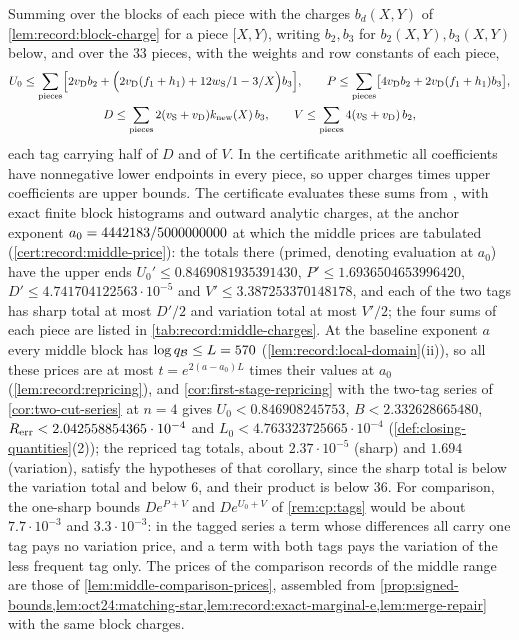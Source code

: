 Summing over the blocks of each piece with the charges $b_d(X,Y)$ of
\cref{lem:record:block-charge} for a piece $[X,Y)$, writing $b_2,b_3$ for $b_2(X,Y),b_3(X,Y)$ below, and over the $33$ pieces, with the weights and
row constants of each piece,
\begin{gather*}
 U_0\le\sum_{\rm pieces}\Bigl[2v_{\rm D}b_2+\Bigl(2v_{\rm D}(f_1+h_1)
  +\frac{12w_{\rm S}}{1-3/X}\Bigr)b_3\Bigr],\qquad
 P\le\sum_{\rm pieces}\bigl[4v_{\rm D}b_2+2v_{\rm D}(f_1+h_1)b_3\bigr],\\
 D\le\sum_{\rm pieces}2(v_{\rm S}+v_{\rm D})k_{\rm new}(X)\,b_3,\qquad
 V\le\sum_{\rm pieces}4(v_{\rm S}+v_{\rm D})\,b_2 ,
\end{gather*}
each tag carrying half of $D$ and of $V$. In the certificate arithmetic all coefficients have nonnegative
lower endpoints in every piece, so upper charges times upper coefficients are
upper bounds. The certificate evaluates these sums from
,
with exact finite block histograms and outward analytic charges, at the anchor exponent
$a_0=\PushAnchor$ at which the middle prices are tabulated
(\cref{cert:record:middle-price}): the totals there (primed, denoting evaluation at $a_0$) have the upper ends
$U_0'\le0.8469081935391430$, $P'\le1.6936504653996420$,
$D'\le4.741704122563\cdot10^{-5}$ and $V'\le3.387253370148178$, and each of
the two tags has sharp total at most $D'/2$ and variation total at most
$V'/2$; the four sums of each piece are listed in
\cref{tab:record:middle-charges}. At the baseline exponent $a$
every middle block has $\log q_{\Blk}\le L=570$
(\cref{lem:record:local-domain}(ii)), so all these prices are at most
$t=e^{2(a-a_0)L}$ times their values at $a_0$ (\cref{lem:record:repricing}),
and \cref{cor:first-stage-repricing} with the two-tag series of
\cref{cor:two-cut-series} at $n=4$ gives $U_0<0.846908245753$,
$B<2.332628665480$, $R_{\rm err}<2.042558854365\cdot10^{-4}$ and
$L_0<4.763323725665\cdot10^{-4}$ (\cref{def:closing-quantities}(2)); the repriced
tag totals, about $2.37\cdot10^{-5}$ (sharp) and $1.694$ (variation), satisfy
the hypotheses of that corollary, since the sharp total is below
the variation total and below $6$, and their product is below $36$. For
comparison, the one-sharp bounds
$De^{P+V}$ and $De^{U_0+V}$ of \cref{rem:cp:tags} would be about
$7.7\cdot10^{-3}$ and $3.3\cdot10^{-3}$: in the tagged series a term whose
differences all carry one tag pays no variation price, and a term with both
tags pays the variation of the less frequent tag only. The prices of the
comparison records of the middle range are those of
\cref{lem:middle-comparison-prices}, assembled from
\cref{prop:signed-bounds,lem:oct24:matching-star,lem:record:exact-marginal-e,lem:merge-repair}
with the same block charges.

